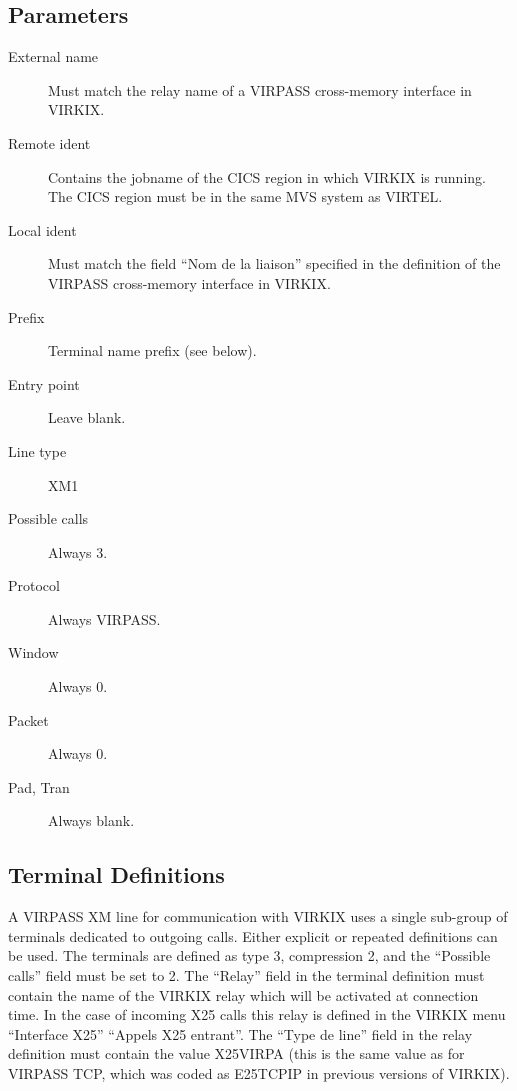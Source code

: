 \documentclass[letterpaper,10pt,english]{sphinxmanual}
\begin{document}
\subsection{Parameters}
\label{\detokenize{connectivity_guide:id20}}\label{\detokenize{connectivity_guide:index-49}}\begin{description}
\item[{External name}] \leavevmode
Must match the relay name of a VIRPASS cross-memory interface in VIRKIX.

\item[{Remote ident}] \leavevmode
Contains the jobname of the CICS region in which VIRKIX is running.
The CICS region must be in the same MVS system as VIRTEL.

\item[{Local ident}] \leavevmode
Must match the field “Nom de la liaison” specified in the definition
of the VIRPASS cross-memory interface in VIRKIX.

\item[{Prefix}] \leavevmode
Terminal name prefix (see below).

\item[{Entry point}] \leavevmode
Leave blank.

\item[{Line type}] \leavevmode
XM1

\item[{Possible calls}] \leavevmode
Always 3.

\item[{Protocol}] \leavevmode
Always VIRPASS.

\item[{Window}] \leavevmode
Always 0.

\item[{Packet}] \leavevmode
Always 0.

\item[{Pad, Tran}] \leavevmode
Always blank.

\end{description}


\subsection{Terminal Definitions}
\label{\detokenize{connectivity_guide:id21}}\label{\detokenize{connectivity_guide:index-50}}
A VIRPASS XM line for communication with VIRKIX uses a single sub-group of terminals dedicated to outgoing calls. Either explicit or repeated definitions can be used. The terminals are defined as type 3, compression 2, and the “Possible calls” field must be set to 2. The “Relay” field in the terminal definition must contain the name of the VIRKIX relay which will be activated at connection time. In the case of incoming X25 calls this relay is defined in the VIRKIX menu “Interface X25” \textendash{} “Appels X25 entrant”. The “Type de line” field in the relay definition must contain the value X25VIRPA (this is the same value as for VIRPASS TCP, which was coded as E25TCPIP in previous versions of VIRKIX).
\end{document}
